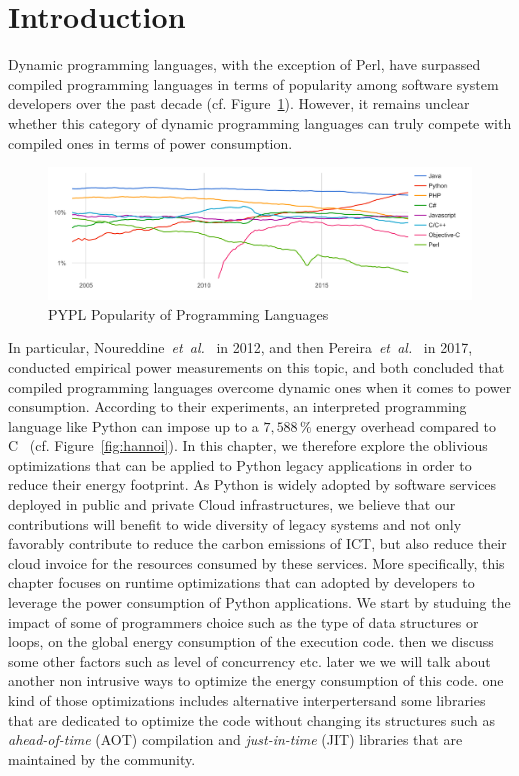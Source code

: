 \section{Introduction}


Dynamic programming languages, with the exception of Perl, have surpassed compiled programming languages in terms of popularity among software system developers over the past decade (cf. Figure~\ref{fig:pypl}).
However, it remains unclear whether this category of dynamic programming languages can truly compete with compiled ones in terms of power consumption. 
\begin{figure}[htbp]
    \includegraphics[width=\linewidth]{imgs/programminglanguangespopularity.png}
    \caption{PYPL Popularity of Programming Languages~\cite{noauthor_pypl_nodate}}
    \label{fig:pypl}
\end{figure}

In particular, Noureddine~\emph{et~al.}~\cite{noureddine_preliminary_2012} in 2012, and then Pereira~\emph{et~al.}~\cite{pereira_energy_2017} in 2017, conducted empirical power measurements on this topic, and both concluded that compiled programming languages overcome dynamic ones when it comes to power consumption.
According to their experiments, an interpreted programming language like Python can impose up to a $7,588\,\%$ energy overhead compared to C~\cite{pereira_energy_2017} (cf. Figure~\ref{fig:hannoi}).
In this chapter, we therefore explore the oblivious optimizations that can be applied to Python legacy applications in order to reduce their energy footprint.
As Python is widely adopted by software services deployed in public and private Cloud infrastructures, we believe that our contributions will benefit to wide diversity of legacy systems and not only favorably contribute to reduce the carbon emissions of ICT, but also reduce their cloud invoice for the resources consumed by these services.
More specifically, this chapter focuses on runtime optimizations that can adopted by developers to leverage the power consumption of Python applications.
We start by studuing the impact of some of programmers choice such as the type of data structures or loops, on the global energy consumption of the execution code.
then we discuss some other factors such as level of concurrency etc. later we we will talk about another non intrusive ways to optimize the energy consumption of this code. one kind of those optimizations includes alternative interpertersand some libraries that are dedicated to optimize the code without changing its structures such as \emph{ahead-of-time} (AOT) compilation and \emph{just-in-time} (JIT) libraries that are maintained by the community.

